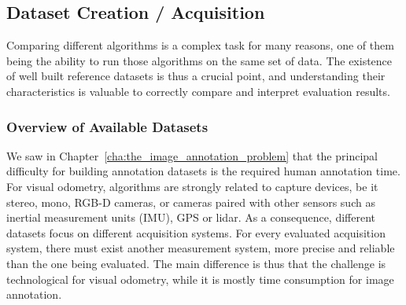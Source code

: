 \subsection{Dataset Creation / Acquisition}%
\label{sub:dataset_creation}

Comparing different algorithms is a complex task for many reasons,
one of them being the ability to run those algorithms on the same set of data.
The existence of well built reference datasets is thus a crucial point,
and understanding their characteristics is valuable to correctly compare and interpret
evaluation results.

\subsubsection{Overview of Available Datasets}%
\label{ssub:datasets_overview}

We saw in Chapter~\ref{cha:the_image_annotation_problem} that the principal
difficulty for building annotation datasets is the required human annotation time.
For visual odometry, algorithms are strongly related to capture devices,
be it stereo, mono, RGB-D cameras, or cameras paired with other sensors
such as inertial measurement units (IMU), GPS or lidar.
As a consequence, different datasets focus on different acquisition systems.
For every evaluated acquisition system, there must exist another measurement system,
more precise and reliable than the one being evaluated.
The main difference is thus that
the challenge is technological for visual odometry,
while it is mostly time consumption for image annotation.

